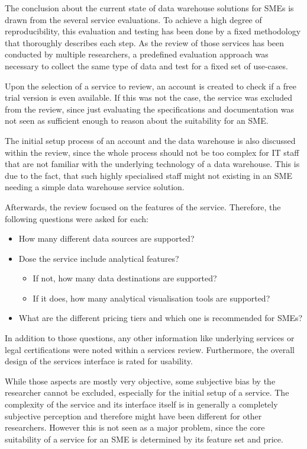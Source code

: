 \documentclass[../paper.tex]{subfiles}
\begin{document}
The conclusion about the current state of data warehouse solutions for SMEs is drawn from the several service evaluations. To achieve a high degree of reproducibility, this evaluation and testing has been done by a fixed methodology that thoroughly describes each step. As the review of those services has been conducted by multiple researchers, a predefined evaluation approach was necessary to collect the same type of data and test for a fixed set of use-cases.

Upon the selection of a service to review, an account is created to check if a free trial version is even available. If this was not the case, the service was excluded from the review, since just evaluating the specifications and documentation was not seen as sufficient enough to reason about the suitability for an SME.

The initial setup process of an account and the data warehouse is also discussed within the review, since the whole process should not be too complex for IT staff that are not familiar with the underlying technology of a data warehouse. This is due to the fact, that such highly specialised staff might not existing in an SME needing a simple data warehouse service solution.

Afterwards, the review focused on the features of the service. Therefore, the following questions were asked for each:
\begin{itemize}
  \item How many different data sources are supported?
  \item Dose the service include analytical features?
  \begin{itemize}
    \item If not, how many data destinations are supported?
    \item If it does, how many analytical visualisation tools are supported?
  \end{itemize}
  \item What are the different pricing tiers and which one is recommended for SMEs?
\end{itemize}

In addition to those questions, any other information like underlying services or legal certifications were noted within a services review. Furthermore, the overall design of the services interface is rated for usability.

While those aspects are mostly very objective, some subjective bias by the researcher cannot be excluded, especially for the initial setup of a service. The complexity of the service and its interface itself is in generally a completely subjective perception and therefore might have been different for other researchers. However this is not seen as a major problem, since the core suitability of a service for an SME is determined by its feature set and price.
\end{document}
